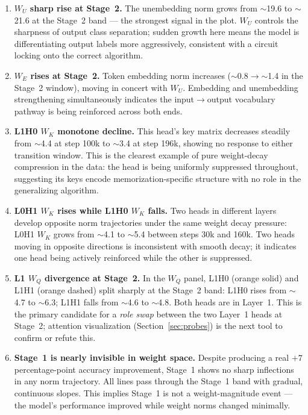 \documentclass[11pt, a4paper]{article}
\begin{document}
\begin{enumerate}[noitemsep]
  \item \textbf{$W_U$ sharp rise at Stage~2.} The unembedding norm grows from
    $\sim$19.6 to $\sim$21.6 at the Stage~2 band --- the strongest signal in the
    plot. $W_U$ controls the sharpness of output class separation; sudden growth
    here means the model is differentiating output labels more aggressively,
    consistent with a circuit locking onto the correct algorithm.

  \item \textbf{$W_E$ rises at Stage~2.} Token embedding norm increases
    ($\sim$0.8$\to$$\sim$1.4 in the Stage~2 window), moving in concert with
    $W_U$. Embedding and unembedding strengthening simultaneously indicates the
    input$\to$output vocabulary pathway is being reinforced across both ends.

  \item \textbf{L1H0 $W_K$ monotone decline.} This head's key matrix decreases
    steadily from $\sim$4.4 at step 100k to $\sim$3.4 at step 196k, showing no
    response to either transition window. This is the clearest example of pure
    weight-decay compression in the data: the head is being uniformly suppressed
    throughout, suggesting its keys encode memorization-specific structure with no
    role in the generalizing algorithm.

  \item \textbf{L0H1 $W_K$ rises while L1H0 $W_K$ falls.} Two heads in
    different layers develop opposite norm trajectories under the same weight
    decay pressure: L0H1 $W_K$ grows from $\sim$4.1 to $\sim$5.4 between
    steps 30k and 160k. Two heads moving in opposite directions is inconsistent
    with smooth decay; it indicates one head being actively reinforced while the
    other is suppressed.

  \item \textbf{L1 $W_Q$ divergence at Stage~2.} In the $W_Q$ panel, L1H0
    (orange solid) and L1H1 (orange dashed) split sharply at the Stage~2 band:
    L1H0 rises from $\sim$4.7 to $\sim$6.3; L1H1 falls from $\sim$4.6 to
    $\sim$4.8. Both heads are in Layer~1. This is the primary candidate for a
    \emph{role swap} between the two Layer~1 heads at Stage~2; attention
    visualization (Section~\ref{sec:probes}) is the next tool to confirm or
    refute this.

  \item \textbf{Stage~1 is nearly invisible in weight space.} Despite producing
    a real $+7$ percentage-point accuracy improvement, Stage~1 shows no sharp
    inflections in any norm trajectory. All lines pass through the Stage~1 band
    with gradual, continuous slopes. This implies Stage~1 is not a
    weight-magnitude event --- the model's performance improved while weight
    norms changed minimally.
\end{enumerate}
\end{document}

